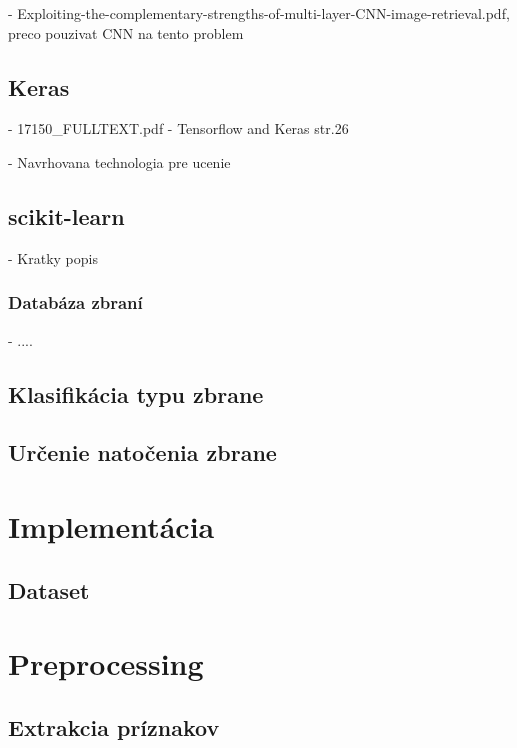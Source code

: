 \documentclass[10pt,a4paper]{article}
\begin{document}
- Exploiting-the-complementary-strengths-of-multi-layer-CNN-image-retrieval.pdf,
preco pouzivat CNN na tento problem

\subsection{Keras}
- 17150\_FULLTEXT.pdf - Tensorflow and Keras str.26

- Navrhovana technologia pre ucenie

\subsection{scikit-learn}
- Kratky popis

\subsubsection{Databáza zbraní}
- ....

\subsection{Klasifikácia typu zbrane}

\subsection{Určenie natočenia zbrane}


\pagebreak
\section{Implementácia}

\subsection{Dataset}



\pagebreak
\renewcommand\refname{Odkazy}


\pagebreak

\section{Preprocessing}

\subsection{Extrakcia príznakov}
\end{document}
